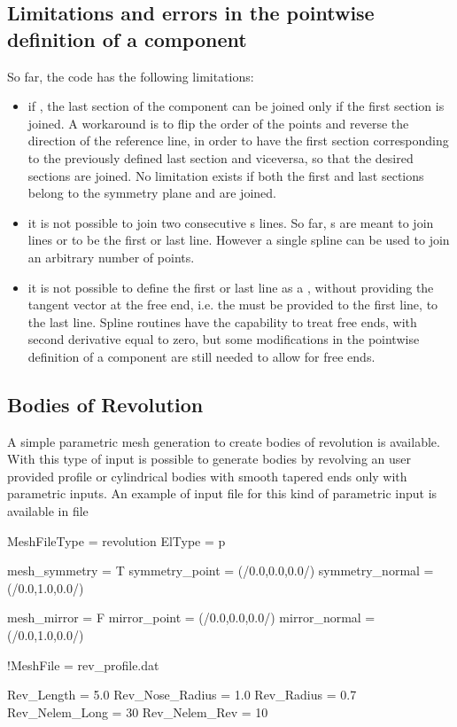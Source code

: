 \subsection{Limitations and errors in the pointwise definition of a component}
So far, the code has the following limitations:
\begin{itemize}
    \item if , the last section of the component can be joined only if the first section is joined. A workaround is to flip the order of the points and reverse the direction of the reference line, in order to have the first section corresponding to the previously defined last section and viceversa, so that the desired sections are joined. No limitation exists if both the first and last sections belong to the symmetry plane and are joined.
    
    \item it is not possible to join two consecutive s lines. So far, s are meant to join  lines or to be the first or last line. However a single spline can be used to join an arbitrary number of points. 
    
    \item it is not possible to define the first or last line as a , without providing the tangent vector at the free end, i.e. the  must be provided to the first line,  to the last line. Spline routines have the capability to treat free ends, with second derivative equal to zero, but some modifications in the pointwise definition of a component are still needed to allow for free ends.
    
\end{itemize}

\subsection{Bodies of Revolution}
\label{subs:Bodies_Revolution}
A simple parametric mesh generation to create bodies of revolution is available. With this type of input is possible to generate bodies by revolving an user provided profile or cylindrical bodies with smooth tapered ends only with parametric inputs. An example of input file for this kind of parametric input is available in file 

\begin{inputfile}[frame=single, caption={Boies of revolution geometry definition }, label={file:revolution_example_file.in}]
MeshFileType = revolution
ElType = p

mesh_symmetry = T
symmetry_point = (/0.0,0.0,0.0/)
symmetry_normal = (/0.0,1.0,0.0/)

mesh_mirror = F
mirror_point = (/0.0,0.0,0.0/)
mirror_normal = (/0.0,1.0,0.0/)

!MeshFile = rev_profile.dat

Rev_Length = 5.0
Rev_Nose_Radius = 1.0
Rev_Radius = 0.7
Rev_Nelem_Long = 30
Rev_Nelem_Rev = 10

\end{inputfile}

